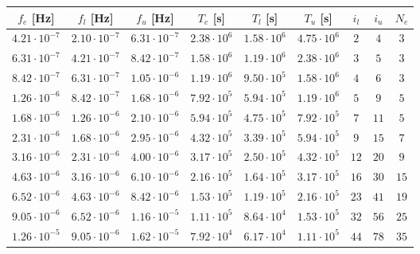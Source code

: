\begin{tabular}{c c c c c c c c c}
\hline
$f_e$ [Hz] & $f_l$ [Hz] & $f_u$ [Hz] & $T_e$ [s] & $T_l$ [s] & $T_u$ [s] & $i_l$ & $i_u$ & $N_e$ \\
\hline\noalign{\smallskip}
$4.21{\cdot} 10^{-7}$ & $2.10{\cdot} 10^{-7}$ & $6.31{\cdot} 10^{-7}$ & $2.38{\cdot} 10^{6}$ & $1.58{\cdot} 10^{6}$ & $4.75{\cdot} 10^{6}$ & $         2$ & $         4$ & $      3$\\
$6.31{\cdot} 10^{-7}$ & $4.21{\cdot} 10^{-7}$ & $8.42{\cdot} 10^{-7}$ & $1.58{\cdot} 10^{6}$ & $1.19{\cdot} 10^{6}$ & $2.38{\cdot} 10^{6}$ & $         3$ & $         5$ & $      3$\\
$8.42{\cdot} 10^{-7}$ & $6.31{\cdot} 10^{-7}$ & $1.05{\cdot} 10^{-6}$ & $1.19{\cdot} 10^{6}$ & $9.50{\cdot} 10^{5}$ & $1.58{\cdot} 10^{6}$ & $         4$ & $         6$ & $      3$\\
$1.26{\cdot} 10^{-6}$ & $8.42{\cdot} 10^{-7}$ & $1.68{\cdot} 10^{-6}$ & $7.92{\cdot} 10^{5}$ & $5.94{\cdot} 10^{5}$ & $1.19{\cdot} 10^{6}$ & $         5$ & $         9$ & $      5$\\
$1.68{\cdot} 10^{-6}$ & $1.26{\cdot} 10^{-6}$ & $2.10{\cdot} 10^{-6}$ & $5.94{\cdot} 10^{5}$ & $4.75{\cdot} 10^{5}$ & $7.92{\cdot} 10^{5}$ & $         7$ & $        11$ & $      5$\\
$2.31{\cdot} 10^{-6}$ & $1.68{\cdot} 10^{-6}$ & $2.95{\cdot} 10^{-6}$ & $4.32{\cdot} 10^{5}$ & $3.39{\cdot} 10^{5}$ & $5.94{\cdot} 10^{5}$ & $         9$ & $        15$ & $      7$\\
$3.16{\cdot} 10^{-6}$ & $2.31{\cdot} 10^{-6}$ & $4.00{\cdot} 10^{-6}$ & $3.17{\cdot} 10^{5}$ & $2.50{\cdot} 10^{5}$ & $4.32{\cdot} 10^{5}$ & $        12$ & $        20$ & $      9$\\
$4.63{\cdot} 10^{-6}$ & $3.16{\cdot} 10^{-6}$ & $6.10{\cdot} 10^{-6}$ & $2.16{\cdot} 10^{5}$ & $1.64{\cdot} 10^{5}$ & $3.17{\cdot} 10^{5}$ & $        16$ & $        30$ & $     15$\\
$6.52{\cdot} 10^{-6}$ & $4.63{\cdot} 10^{-6}$ & $8.42{\cdot} 10^{-6}$ & $1.53{\cdot} 10^{5}$ & $1.19{\cdot} 10^{5}$ & $2.16{\cdot} 10^{5}$ & $        23$ & $        41$ & $     19$\\
$9.05{\cdot} 10^{-6}$ & $6.52{\cdot} 10^{-6}$ & $1.16{\cdot} 10^{-5}$ & $1.11{\cdot} 10^{5}$ & $8.64{\cdot} 10^{4}$ & $1.53{\cdot} 10^{5}$ & $        32$ & $        56$ & $     25$\\
$1.26{\cdot} 10^{-5}$ & $9.05{\cdot} 10^{-6}$ & $1.62{\cdot} 10^{-5}$ & $7.92{\cdot} 10^{4}$ & $6.17{\cdot} 10^{4}$ & $1.11{\cdot} 10^{5}$ & $        44$ & $        78$ & $     35$\\

\end{tabular}
